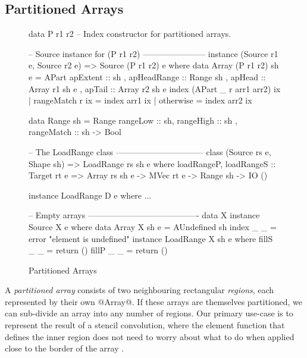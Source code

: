 \subsection{Partitioned Arrays}
\label{section:Partitioned}
\label{section:Undefined}

\begin{figure}
\begin{small}
\begin{code}
data P r1 r2  -- Index constructor for partitioned arrays.

-- Source instance for (P r1 r2) -----------------------
instance (Source r1 e, Source r2 e)  
       => Source (P r1 r2) e where
 data Array (P r1 r2) sh e
   = APart { apExtent    :: sh
           , apHeadRange :: Range sh
           , apHead      :: Array r1 sh e
           , apTail      :: Array r2 sh e }
 index (APart _ r arr1 arr2) ix
   | rangeMatch r ix     = index arr1 ix
   | otherwise           = index arr2 ix
   
data Range sh
   = Range { rangeLow   :: sh, rangeHigh  :: sh
           , rangeMatch :: sh -> Bool }

-- The LoadRange class  --------------------------------
class (Source rs e, Shape sh) => LoadRange rs sh e where
 loadRangeP, loadRangeS 
    :: Target rt e
    => Array rs sh e -> MVec rt e -> Range sh -> IO ()

instance LoadRange D e where ...

-- Empty arrays ----------------------------------------
data X
instance Source X e where
  data Array X sh e = AUndefined sh
  index _ _         = error "element is undefined"
instance LoadRange X sh e where
  fillS _ _ = return ()
  fillP _ _ = return ()
\end{code}
\end{small}
\caption{Partitioned Arrays}
\label{figure:Partitioned}
\end{figure}

A \emph{partitioned array} consists of two neighbouring rectangular \emph{regions}, each represented by their own @Array@.  If these arrays are themselves partitioned, we can sub-divide an array into any number of regions.  Our primary use-case is to represent the result of a stencil convolution, where the element function that defines the inner region does not need to worry about what to do when applied close to the border of the array \cite{Lippmeier:Stencil}. 

